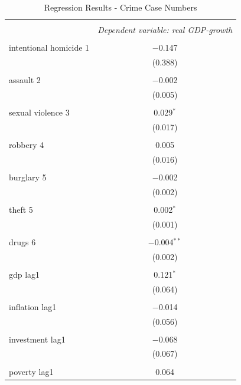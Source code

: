 \documentclass[a4paper,12pt]{article}
\begin{document}
\begin{singlespace}
		\begin{table}[!htbp]
			\centering
			\def\sym#1{\ifmmode^{#1}\else\(^{#1}\)\fi}
			\begin{threeparttable}
				\caption{Regression Results - Crime Case Numbers}\label{tab:crime_case_number} 
\begin{tabular}{@{\extracolsep{5pt}}lc} 
\\[-1.8ex]\hline 
\hline \\[-1.8ex] 
 & \multicolumn{1}{c}{\textit{Dependent variable: real GDP-growth}} \\ 
\cline{2-2}  
\hline \\[-1.8ex] 
 intentional homicide 1 & $-$0.147 \\ 
  & (0.388) \\ 
  & \\ 
  [-1.8ex]
 assault 2 & $-$0.002 \\ 
  & (0.005) \\ 
  & \\ 
  [-1.8ex]
 sexual violence 3 & 0.029$^{*}$ \\ 
  & (0.017) \\ 
  & \\ 
  [-1.8ex]
 robbery 4 & 0.005 \\ 
  & (0.016) \\ 
  & \\ 
  [-1.8ex]
 burglary 5 & $-$0.002 \\ 
  & (0.002) \\ 
  & \\
  [-1.8ex]
 theft 5 & 0.002$^{*}$ \\ 
  & (0.001) \\ 
  & \\ 
 drugs 6 & $-$0.004$^{**}$ \\ 
  & (0.002) \\ 
    [-1.8ex]
  & \\
  \hline
 gdp lag1 & 0.121$^{*}$ \\ 
  & (0.064) \\ 
  & \\ 
  [-1.8ex]
 inflation lag1 & $-$0.014 \\ 
  & (0.056) \\ 
  & \\ 
  [-1.8ex]
 investment lag1 & $-$0.068 \\ 
  & (0.067) \\ 
  & \\ 
  [-1.8ex]
 poverty lag1 & 0.064 \\ 

\end{tabular}
\end{threeparttable}
\end{table}
\end{singlespace}
\end{document}

